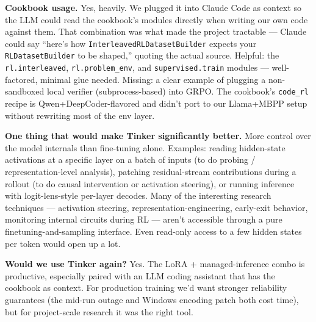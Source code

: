 \documentclass[11pt]{article}
\begin{document}
\textbf{Cookbook usage.} Yes, heavily. We plugged it into Claude Code as context so the LLM could read the cookbook's modules directly when writing our own code against them. That combination was what made the project tractable --- Claude could say ``here's how \texttt{InterleavedRLDatasetBuilder} expects your \texttt{RLDatasetBuilder} to be shaped,'' quoting the actual source. Helpful: the \texttt{rl.interleaved}, \texttt{rl.problem\_env}, and \texttt{supervised.train} modules --- well-factored, minimal glue needed. Missing: a clear example of plugging a non-sandboxed local verifier (subprocess-based) into GRPO. The cookbook's \texttt{code\_rl} recipe is Qwen+DeepCoder-flavored and didn't port to our Llama+MBPP setup without rewriting most of the env layer.

\textbf{One thing that would make Tinker significantly better.} More control over the model internals than fine-tuning alone. Examples: reading hidden-state activations at a specific layer on a batch of inputs (to do probing / representation-level analysis), patching residual-stream contributions during a rollout (to do causal intervention or activation steering), or running inference with logit-lens-style per-layer decodes. Many of the interesting research techniques --- activation steering, representation-engineering, early-exit behavior, monitoring internal circuits during RL --- aren't accessible through a pure finetuning-and-sampling interface. Even read-only access to a few hidden states per token would open up a lot.

\textbf{Would we use Tinker again?} Yes. The LoRA + managed-inference combo is productive, especially paired with an LLM coding assistant that has the cookbook as context. For production training we'd want stronger reliability guarantees (the mid-run outage and Windows encoding patch both cost time), but for project-scale research it was the right tool.
\end{document}
